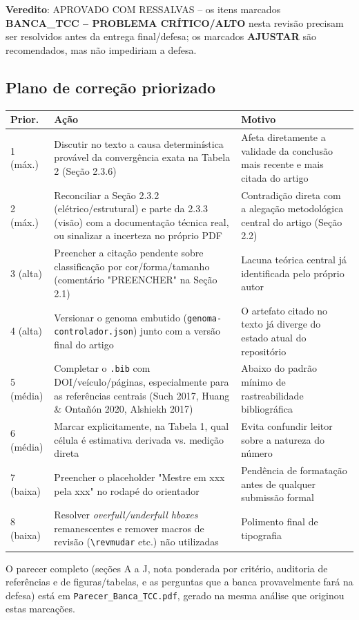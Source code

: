 \documentclass[12pt,a4paper]{article}
\begin{document}
\textbf{Veredito}: APROVADO COM RESSALVAS -- os itens marcados
\textbf{\color{red!60!black}BANCA\_TCC -- PROBLEMA CRÍTICO/ALTO} nesta revisão precisam ser
resolvidos antes da entrega final/defesa; os marcados \textbf{AJUSTAR} são recomendados, mas não
impediriam a defesa.

\subsection*{Plano de correção priorizado}

\footnotesize
\begin{longtable}{|p{0.9cm}|p{6.3cm}|p{7.0cm}|}
\hline
\textbf{Prior.} & \textbf{Ação} & \textbf{Motivo} \\
\hline
\endhead
1 (máx.) & Discutir no texto a causa determinística provável da convergência exata na Tabela 2
(Seção 2.3.6) & Afeta diretamente a validade da conclusão mais recente e mais citada do artigo \\
\hline
2 (máx.) & Reconciliar a Seção 2.3.2 (elétrico/estrutural) e parte da 2.3.3 (visão) com a
documentação técnica real, ou sinalizar a incerteza no próprio PDF & Contradição direta com a
alegação metodológica central do artigo (Seção 2.2) \\
\hline
3 (alta) & Preencher a citação pendente sobre classificação por cor/forma/tamanho (comentário
"PREENCHER" na Seção 2.1) & Lacuna teórica central já identificada pelo próprio autor \\
\hline
4 (alta) & Versionar o genoma embutido (\texttt{genoma-controlador.json}) junto com a versão final
do artigo & O artefato citado no texto já diverge do estado atual do repositório \\
\hline
5 (média) & Completar o \texttt{.bib} com DOI/veículo/páginas, especialmente para as referências
centrais (Such 2017, Huang \& Ontañón 2020, Alshiekh 2017) & Abaixo do padrão mínimo de
rastreabilidade bibliográfica \\
\hline
6 (média) & Marcar explicitamente, na Tabela 1, qual célula é estimativa derivada vs. medição
direta & Evita confundir leitor sobre a natureza do número \\
\hline
7 (baixa) & Preencher o placeholder "Mestre em xxx pela xxx" no rodapé do orientador & Pendência
de formatação antes de qualquer submissão formal \\
\hline
8 (baixa) & Resolver \textit{overfull/underfull hboxes} remanescentes e remover macros de revisão
(\texttt{\textbackslash revmudar} etc.) não utilizadas & Polimento final de tipografia \\
\hline
\end{longtable}
\normalsize

O parecer completo (seções A a J, nota ponderada por critério, auditoria de referências e de
figuras/tabelas, e as perguntas que a banca provavelmente fará na defesa) está em
\texttt{Parecer\_Banca\_TCC.pdf}, gerado na mesma análise que originou estas marcações.


\end{document}
